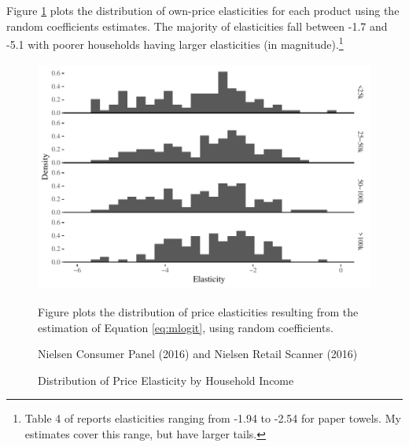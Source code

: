 \documentclass[AER]{AEA_mal}
\begin{document}
Figure \ref{fig:elasticity_Random} plots the distribution of own-price elasticities for each product using the random coefficients estimates. The majority of elasticities fall between -1.7 and -5.1 with poorer households having larger elasticities (in magnitude).\footnote{Table 4 of \citet{cohen2008} reports elasticities ranging from -1.94 to -2.54 for paper towels. My estimates cover this range, but have larger tails.}

\begin{figure}[!htb]
\centering
\caption{Distribution of Price Elasticity by Household Income}
\includegraphics[width = 5in, height = 3in]{../5_figures/elasticity2016_Random.pdf}
\begin{figurenotes}
Figure plots the distribution of price elasticities resulting from the estimation of Equation \ref{eq:mlogit}, using random coefficients.
\end{figurenotes}
\begin{figurenotes}[Source]
Nielsen Consumer Panel (2016) and Nielsen Retail Scanner (2016)
\end{figurenotes}
\label{fig:elasticity_Random}
\end{figure}
\end{document}
